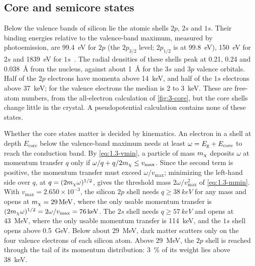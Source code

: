 \subsection{Core and semicore states}

Below the valence bands of silicon lie the atomic shells $2p$, $2s$ and $1s$. Their binding energies relative to the valence-band maximum, measured by photoemission, are \SI{99.4}{eV} for $2p$ (the $2p_{3/2}$ level; $2p_{1/2}$ is at \SI{99.8}{eV}), \SI{150}{eV} for $2s$ and \SI{1839}{eV} for $1s$~\cite[Table~1-1]{williams2009electron}. The radial densities of these shells peak at 0.21, 0.24 and \SI{0.038}{\angstrom} from the nucleus, against about \SI{1}{\angstrom} for the $3s$ and $3p$ valence orbitals. Half of the $2p$ electrons have momenta above \SI{14}{keV}, and half of the $1s$ electrons above \SI{37}{keV}; for the valence electrons the median is 2 to \SI{3}{keV}. These are free-atom numbers, from the all-electron calculation of \cref{fig:3-core}, but the core shells change little in the crystal. A pseudopotential calculation contains none of these states.

Whether the core states matter is decided by kinematics. An electron in a shell at depth $E_{\mathrm{core}}$ below the valence-band maximum needs at least $\omega = E_{\mathrm{g}} + E_{\mathrm{core}}$ to reach the conduction band. By \cref{eq:1.3-vmin}, a particle of mass $m_{\chi}$ deposits $\omega$ at momentum transfer $q$ only if $\omega/q + q/2m_{\chi} \le v_{\mathrm{max}}$. Since the second term is positive, the momentum transfer must exceed $\omega/v_{\mathrm{max}}$; minimizing the left-hand side over $q$, at $q = (2m_{\chi}\omega)^{1/2}$, gives the threshold mass $2\omega/v_{\mathrm{max}}^2$ of \cref{eq:1.3-mmin}. With $v_{\mathrm{max}} = 2.650\times10^{-3}$, the silicon $2p$ shell needs $q \ge \SI{38}{keV}$ for any mass and opens at $m_{\chi} = \SI{29}{MeV}$, where the only usable momentum transfer is $(2m_{\chi}\omega)^{1/2} = 2\omega/v_{\mathrm{max}} = \SI{76}{keV}$. The $2s$ shell needs $q \ge \SI{57}{keV}$ and opens at \SI{43}{MeV}, where the only usable momentum transfer is \SI{114}{keV}, and the $1s$ shell opens above \SI{0.5}{GeV}. Below about \SI{29}{MeV}, dark matter scatters only on the four valence electrons of each silicon atom. Above \SI{29}{MeV}, the $2p$ shell is reached through the tail of its momentum distribution: \SI{3}{\percent} of its weight lies above \SI{38}{keV}.

